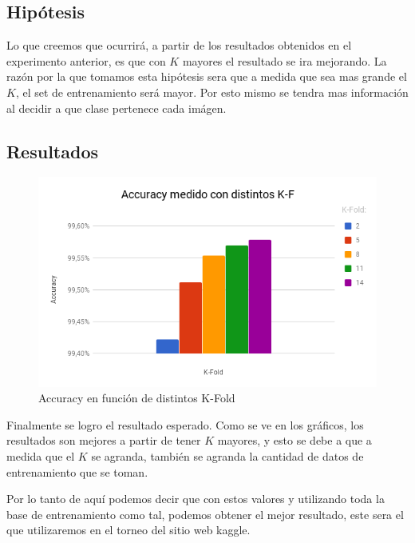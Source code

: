 \subsection{Hipótesis}

Lo que creemos que ocurrirá, a partir de los resultados obtenidos en el experimento anterior, es que con $K$ mayores el resultado se ira mejorando. La razón por la que tomamos esta hipótesis sera que a medida que sea mas grande el $K$, el set de entrenamiento será mayor. Por esto mismo se tendra mas información al decidir a que clase pertenece cada imágen.

\subsection{Resultados}

\begin{figure}
	\centering
	\includegraphics[width=\textwidth]{graficos/Distintos_kfold.png}
	\caption{Accuracy en función de distintos K-Fold}
	\label{fig:distintos_kfold}
\end{figure}

Finalmente se logro el resultado esperado. Como se ve en los gráficos, los resultados son mejores a partir de tener $K$ mayores, y esto se debe a que a medida que el $K$ se agranda, también se agranda la cantidad de datos de entrenamiento que se toman.

Por lo tanto de aquí podemos decir que con estos valores y utilizando toda la base de entrenamiento como tal, podemos obtener el mejor resultado, este sera el que utilizaremos en el torneo del sitio web kaggle.
